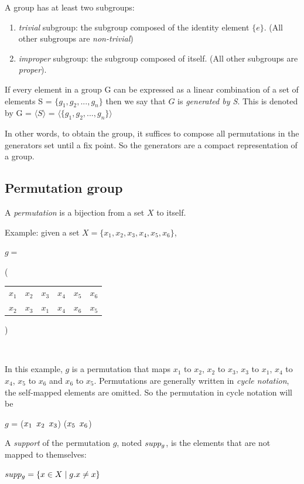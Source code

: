 A group has at least two subgroups: 
\begin{enumerate}[topsep=0pt,nolistsep]
 \item \emph{trivial} subgroup: the subgroup composed of the identity element $\{e\}$. (All other subgroups are \textit{non-trivial})
 \item \emph{improper} subgroup: the subgroup composed of itself. (All other subgroups are \emph{proper}).
\end{enumerate}
\begin{definition}
 If every element in a group G can be expressed as a linear combination
 of a set of elements S = $\{g_1, g_2, ..., g_n \}$ then we say that $G$ is 
 \textit{generated by S}. This is denoted by G = $\langle S \rangle$ =
 $\langle \{g_1, g_2, ..., g_n \} \rangle$ 
\end{definition}
In other words, to obtain the group, it suffices to compose all permutations in the generators set until a fix point.
So the generators are a compact representation of a group.
\subsection{Permutation group}
\begin{definition}[Permutation]
 A \emph{permutation} is a bijection from a set $X$ to itself.
\end{definition}
Example: given a set $X = \{x_1, x_2, x_3, x_4, x_5, x_6\}$,
\begin{center}
$g = ${\Bigg( \begin{tabular}{cccccc}
  $x_1$ & $x_2$ & $x_3$ & $x_4$ & $x_5$ & $x_6$\\
  $x_2$ & $x_3$ & $x_1$ & $x_4$ & $x_6$ & $x_5$
 \end{tabular} \Bigg)}\\
\end{center}
In this example, $g$ is a permutation that maps $x_1$ to $x_2$, $x_2$ to $x_3$, $x_3$ to $x_1$, $x_4$ to $x_4$, $x_5$ to $x_6$ and $x_6$ to $x_5$.
Permutations are generally written in \emph{cycle notation}, the self-mapped elements are omitted.
So the permutation in cycle notation will be 
\begin{center}
 $g$ = ($x_1 \enskip x_2 \enskip x_3$) ($x_5 \enskip x_6$)
\end{center}
\begin{definition}
 A \emph{support} of the permutation $g$, noted $supp_{g}$, is the elements that are not mapped to themselves:
 \begin{center}
  $supp_{g} = \{ x \in X \mid g.x \neq x\}$
 \end{center}
\end{definition}

